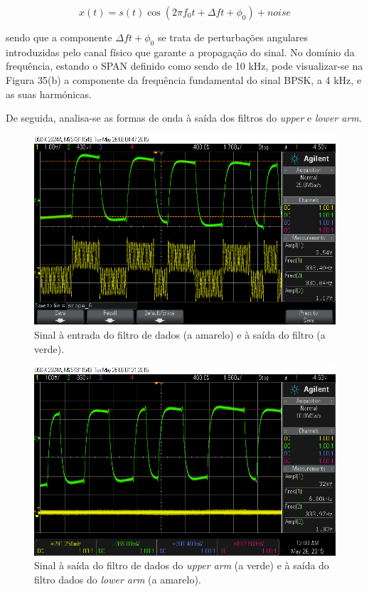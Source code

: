 \documentclass[11pt]{article}
\numberwithin{equation}{section}
\begin{document}
\vspace{-3mm}
\begin{equation}
	x(t) = s(t)\cos(2\pi f_0t + \Delta ft + \phi_0) + noise
\end{equation} 

sendo que a componente $\Delta ft + \phi_0$ se trata de perturbações angulares introduzidas pelo canal físico que garante a propagação do sinal. No domínio da frequência, estando o SPAN definido como sendo de 10 kHz, pode visualizar-se na Figura 35(b) a componente da frequência fundamental do sinal BPSK, a 4 kHz, e as suas harmónicas.


De seguida, analisa-se as formas de onda à saída dos filtros do \textit{upper} e \textit{lower arm}.

\begin{figure}[H]
	\centering
	\includegraphics[keepaspectratio=true, scale=0.37]{exps/ineoutdofiltro}
	\caption{Sinal à entrada do filtro de dados (a amarelo) e à saída do filtro (a verde).}
	\vspace{-0.8em}
\end{figure}


\begin{figure}[H]
	\centering
	\includegraphics[keepaspectratio=true, scale=0.37]{exps/upperandlowerarm}
	\caption{Sinal à saída do filtro de dados do \textit{upper arm} (a verde) e à saída do filtro dados do \textit{lower arm} (a amarelo).}
	\vspace{-0.8em}
\end{figure}
\end{document}
